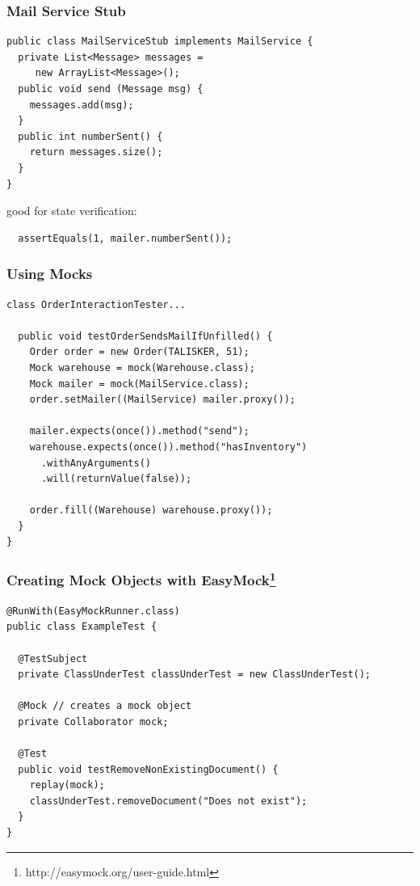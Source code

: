 \documentclass{beamer}
\newenvironment{changemargin}[1]{%
  \begin{list}{}{%
    \setlength{\topsep}{0pt}%
    \setlength{\leftmargin}{#1}%
    \setlength{\rightmargin}{1em}
    \setlength{\listparindent}{\parindent}%
    \setlength{\itemindent}{\parindent}%
    \setlength{\parsep}{\parskip}%
  }%
  \item[]}{\end{list}}
\begin{document}
\begin{frame}[fragile]
  \frametitle{Mail Service Stub}
{\small    \begin{lstlisting}
public class MailServiceStub implements MailService {
  private List<Message> messages =
     new ArrayList<Message>();
  public void send (Message msg) {
    messages.add(msg);
  }
  public int numberSent() {
    return messages.size();
  }
}     
  \end{lstlisting}
  }
    \begin{changemargin}{1cm}
      good for state verification:
\begin{lstlisting}      
  assertEquals(1, mailer.numberSent());
\end{lstlisting}
    \end{changemargin}
\end{frame}

\begin{frame}[fragile]
  \frametitle{Using Mocks}
{\small    \begin{lstlisting}
class OrderInteractionTester...

  public void testOrderSendsMailIfUnfilled() {
    Order order = new Order(TALISKER, 51);
    Mock warehouse = mock(Warehouse.class);
    Mock mailer = mock(MailService.class);
    order.setMailer((MailService) mailer.proxy());

    mailer.expects(once()).method("send");
    warehouse.expects(once()).method("hasInventory")
      .withAnyArguments()
      .will(returnValue(false));

    order.fill((Warehouse) warehouse.proxy());
  }
}
  \end{lstlisting}}
\end{frame}

\begin{frame}[fragile]
  \frametitle{Creating Mock Objects with EasyMock\footnote{http://easymock.org/user-guide.html}}

  {\small \begin{lstlisting}
@RunWith(EasyMockRunner.class)
public class ExampleTest {

  @TestSubject
  private ClassUnderTest classUnderTest = new ClassUnderTest();

  @Mock // creates a mock object
  private Collaborator mock;

  @Test
  public void testRemoveNonExistingDocument() {
    replay(mock);
    classUnderTest.removeDocument("Does not exist");
  }
}      
               \end{lstlisting}
               }
\end{frame}
\end{document}
